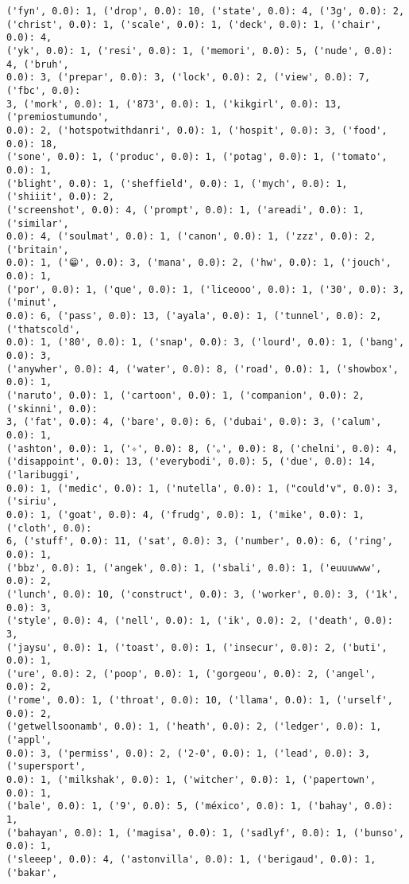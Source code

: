 \documentclass[11pt]{article}
\begin{document}
\begin{Verbatim}[commandchars=\\\{\}]
('fyn', 0.0): 1, ('drop', 0.0): 10, ('state', 0.0): 4, ('3g', 0.0): 2,
('christ', 0.0): 1, ('scale', 0.0): 1, ('deck', 0.0): 1, ('chair', 0.0): 4,
('yk', 0.0): 1, ('resi', 0.0): 1, ('memori', 0.0): 5, ('nude', 0.0): 4, ('bruh',
0.0): 3, ('prepar', 0.0): 3, ('lock', 0.0): 2, ('view', 0.0): 7, ('fbc', 0.0):
3, ('mork', 0.0): 1, ('873', 0.0): 1, ('kikgirl', 0.0): 13, ('premiostumundo',
0.0): 2, ('hotspotwithdanri', 0.0): 1, ('hospit', 0.0): 3, ('food', 0.0): 18,
('sone', 0.0): 1, ('produc', 0.0): 1, ('potag', 0.0): 1, ('tomato', 0.0): 1,
('blight', 0.0): 1, ('sheffield', 0.0): 1, ('mych', 0.0): 1, ('shiiit', 0.0): 2,
('screenshot', 0.0): 4, ('prompt', 0.0): 1, ('areadi', 0.0): 1, ('similar',
0.0): 4, ('soulmat', 0.0): 1, ('canon', 0.0): 1, ('zzz', 0.0): 2, ('britain',
0.0): 1, ('😁', 0.0): 3, ('mana', 0.0): 2, ('hw', 0.0): 1, ('jouch', 0.0): 1,
('por', 0.0): 1, ('que', 0.0): 1, ('liceooo', 0.0): 1, ('30', 0.0): 3, ('minut',
0.0): 6, ('pass', 0.0): 13, ('ayala', 0.0): 1, ('tunnel', 0.0): 2, ('thatscold',
0.0): 1, ('80', 0.0): 1, ('snap', 0.0): 3, ('lourd', 0.0): 1, ('bang', 0.0): 3,
('anywher', 0.0): 4, ('water', 0.0): 8, ('road', 0.0): 1, ('showbox', 0.0): 1,
('naruto', 0.0): 1, ('cartoon', 0.0): 1, ('companion', 0.0): 2, ('skinni', 0.0):
3, ('fat', 0.0): 4, ('bare', 0.0): 6, ('dubai', 0.0): 3, ('calum', 0.0): 1,
('ashton', 0.0): 1, ('✧', 0.0): 8, ('｡', 0.0): 8, ('chelni', 0.0): 4,
('disappoint', 0.0): 13, ('everybodi', 0.0): 5, ('due', 0.0): 14, ('laribuggi',
0.0): 1, ('medic', 0.0): 1, ('nutella', 0.0): 1, ("could'v", 0.0): 3, ('siriu',
0.0): 1, ('goat', 0.0): 4, ('frudg', 0.0): 1, ('mike', 0.0): 1, ('cloth', 0.0):
6, ('stuff', 0.0): 11, ('sat', 0.0): 3, ('number', 0.0): 6, ('ring', 0.0): 1,
('bbz', 0.0): 1, ('angek', 0.0): 1, ('sbali', 0.0): 1, ('euuuwww', 0.0): 2,
('lunch', 0.0): 10, ('construct', 0.0): 3, ('worker', 0.0): 3, ('1k', 0.0): 3,
('style', 0.0): 4, ('nell', 0.0): 1, ('ik', 0.0): 2, ('death', 0.0): 3,
('jaysu', 0.0): 1, ('toast', 0.0): 1, ('insecur', 0.0): 2, ('buti', 0.0): 1,
('ure', 0.0): 2, ('poop', 0.0): 1, ('gorgeou', 0.0): 2, ('angel', 0.0): 2,
('rome', 0.0): 1, ('throat', 0.0): 10, ('llama', 0.0): 1, ('urself', 0.0): 2,
('getwellsoonamb', 0.0): 1, ('heath', 0.0): 2, ('ledger', 0.0): 1, ('appl',
0.0): 3, ('permiss', 0.0): 2, ('2-0', 0.0): 1, ('lead', 0.0): 3, ('supersport',
0.0): 1, ('milkshak', 0.0): 1, ('witcher', 0.0): 1, ('papertown', 0.0): 1,
('bale', 0.0): 1, ('9', 0.0): 5, ('méxico', 0.0): 1, ('bahay', 0.0): 1,
('bahayan', 0.0): 1, ('magisa', 0.0): 1, ('sadlyf', 0.0): 1, ('bunso', 0.0): 1,
('sleeep', 0.0): 4, ('astonvilla', 0.0): 1, ('berigaud', 0.0): 1, ('bakar',

\end{Verbatim}
\end{document}
